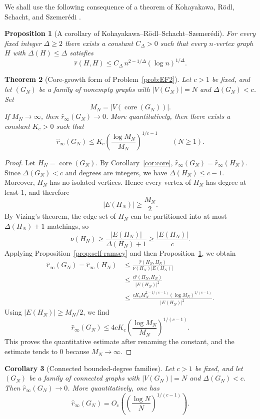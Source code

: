 \documentclass[11pt]{article}
\newcommand{\sr}{\hat r}
\newcommand{\sri}{\hat r_{\infty}}
\newcommand{\core}{\operatorname{core}}
\newtheorem{theorem}{Theorem}[section]
\newtheorem{proposition}[theorem]{Proposition}
\newtheorem{corollary}[theorem]{Corollary}
\theoremstyle{definition}
\theoremstyle{remark}
\begin{document}
We shall use the following consequence of a theorem of
Kohayakawa, R\"odl, Schacht, and Szemer\'edi \cite[Theorem~1]{KRSS11}.

\begin{proposition}[A corollary of Kohayakawa--R\"odl--Schacht--Szemer\'edi]
\label{prop:KRSS}
For every fixed integer $\Delta\ge 2$ there exists a constant $C_{\Delta}>0$ such that every
$n$-vertex graph $H$ with $\Delta(H)\le \Delta$ satisfies
\[
\sr(H,H)\le C_{\Delta}\,n^{2-1/\Delta}(\log n)^{1/\Delta}.
\]
\end{proposition}



\begin{theorem}[Core-growth form of Problem~\ref{prob:EF2}]
\label{thm:core-growth}
Let $c>1$ be fixed, and let $(G_N)$ be a family of nonempty graphs with
$|V(G_N)|=N$ and 
$\Delta(G_N)<c$.
Set
\[
M_N=|V(\core(G_N))|.
\]
If $M_N\to\infty$, then
$\sri(G_N)\to 0$.
More quantitatively, 
then there exists a constant $K_c>0$ such that
\[
\sri(G_N)\le K_c\left(\frac{\log M_N}{M_N}\right)^{1/c-1}
\qquad (N\ge 1).
\]
\end{theorem}

\begin{proof}
Let
$H_N=\core(G_N)$.
By Corollary~\ref{cor:core},
$\sri(G_N)=\sri(H_N)$.
Since $\Delta(G_N)<c$ and degrees are integers, we have
$\Delta(H_N)\le c-1.$
Moreover, $H_N$ has no isolated vertices. Hence every vertex of $H_N$ has degree at least
$1$, and therefore
\[
|E(H_N)|\ge \frac{M_N}{2}.
\]
By Vizing's theorem, the edge set of $H_N$ can be partitioned into at most $\Delta(H_N)+1$
matchings, so
\[
\nu(H_N)\ge \frac{|E(H_N)|}{\Delta(H_N)+1}\ge \frac{|E(H_N)|}{c}.
\]
Applying Proposition~\ref{prop:self-ramsey} and then Proposition~\ref{prop:KRSS}, we
obtain
\[
\begin{aligned}
\sri(G_N)=\sri(H_N)
&\le \frac{\sr(H_N,H_N)}{\nu(H_N)|E(H_N)|}\\
&\le \frac{c\sr(H_N,H_N)}{|E(H_N)|^2}\\
&\le \frac{c K_{c}M_N^{2-1/(c-1)}(\log M_N)^{1/(c-1)}}
{|E(H_N)|^2}.
\end{aligned}
\]
Using $|E(H_N)|\ge M_N/2$, we find
\[
\sri(G_N)
\le 4c K_{c}
\left(\frac{\log M_N}{M_N}\right)^{1/(c-1)}.
\]
This proves the quantitative estimate after renaming the constant, and the estimate tends to
$0$ because $M_N\to\infty$.
\end{proof}

\begin{corollary}[Connected bounded-degree families]\label{cor:connected-two}
Let $c>1$ be fixed, and let $(G_N)$ be a family of connected graphs with
$|V(G_N)|=N$ and 
$\Delta(G_N)<c$.
Then 
$\sri(G_N)\to 0$.
More quantitatively, one has
\[
\sri(G_N)=O_c\!\left(\left(\frac{\log N}{N}\right)^{1/(c-1)}\right).
\]
\end{corollary}
\end{document}
